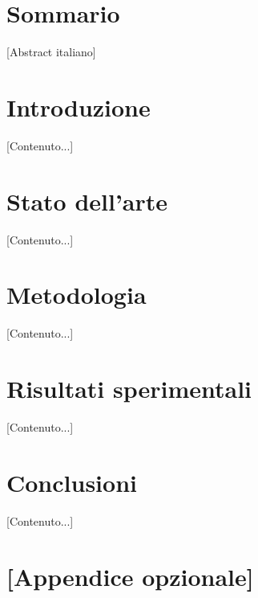 \documentclass[12pt,a4paper,oneside,openright]{report}
\begin{document}
\chapter*{Sommario}
[Abstract italiano]

\tableofcontents
\listoffigures
\listoftables

\chapter{Introduzione}
[Contenuto...]

\chapter{Stato dell'arte}
[Contenuto...]

\chapter{Metodologia}
[Contenuto...]

\chapter{Risultati sperimentali}
[Contenuto...]

\chapter{Conclusioni}
[Contenuto...]

\printbibliography[heading=bibintoc, title={Bibliografia}]

\appendix
\chapter{[Appendice opzionale]}
\end{document}
